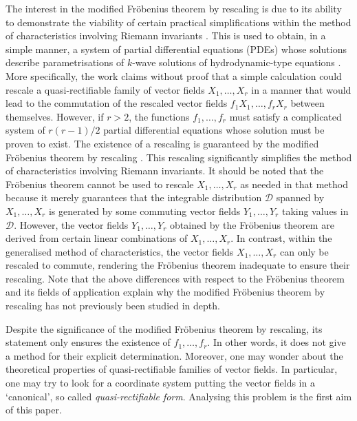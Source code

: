 \documentclass[12pt]{article}
\theoremstyle{plain}
\theoremstyle{definition}
\numberwithin{equation}{section}
\begin{document}
The interest in the modified Fr\"obenius theorem by rescaling is due to its ability to demonstrate the viability of certain practical simplifications within the method of characteristics involving Riemann invariants \cite{Gr74II,GL23,GV91,Pe74}. This is used to obtain, in a simple manner, a system of partial differential equations (PDEs) whose solutions describe parametrisations of $k$-wave solutions of hydrodynamic-type equations \cite{GT96,GV91,GZ83a,GZ83b}. More specifically, the work \cite[p. 239]{GV91} claims without proof that a simple calculation could rescale a quasi-rectifiable family of vector fields $X_1,\ldots,X_r$ in a manner that would lead to the commutation of the rescaled vector fields $f_1X_1,\ldots,f_rX_r$ between themselves. However, if $r>2$, the functions $f_1,\ldots,f_r$ must satisfy a complicated system of $r(r-1)/2$ partial differential equations whose solution must be proven to exist. The existence of a rescaling is guaranteed by the modified Fr\"obenius theorem by rescaling \cite{GL23}. This rescaling significantly simplifies the method of characteristics involving Riemann invariants. It should be noted that the Fr\"obenius theorem cannot be used to rescale $X_1,\ldots,X_r$ as needed in that method because it merely guarantees that the integrable distribution $\mathcal{D}$ spanned by $X_1,\ldots,X_r$ is generated by some commuting vector fields $Y_1,\ldots,Y_r$ taking values in $\mathcal{D}$. However, the vector fields $Y_1,\ldots,Y_r$ obtained by the Fr\"obenius theorem are derived from certain linear combinations of $X_1,\ldots,X_r$. In contrast, within the generalised method of characteristics, the vector fields $X_1,\ldots,X_r$ can only be rescaled to commute, rendering the Fr\"obenius theorem inadequate to ensure their rescaling. Note that the above differences with respect to the Fr\"obenius theorem and its fields of application explain why the modified Fr\"obenius theorem by rescaling \cite{GL23} has not previously been studied in depth. 

Despite the significance of the modified Fr\"obenius theorem by rescaling, its statement only ensures the existence of $f_1,\ldots,f_r$. In other words, it does not give a method for their explicit determination. Moreover, one may wonder about the theoretical properties of quasi-rectifiable families of vector fields. In particular, one may try to look for a coordinate system putting the vector fields in a `canonical', so called {\it quasi-rectifiable form}.  Analysing this problem is the first aim of this paper. 
\end{document}
